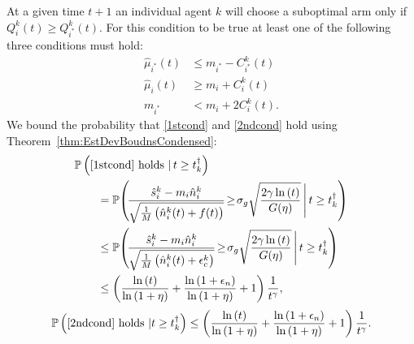 \documentclass[final,5p,times,twocolumn]{elsarticle}
\theoremstyle{definition}
\newcommand{\lnn}[1]{%
	\ln  \left(#1\right)%
}
\begin{document}
At a given time $t+1$ an individual agent $k$ will choose a suboptimal arm only if 
$ Q_i^k(t) \geq Q_{i^*}^k(t)$. 
For this condition to be true at least one of the following three conditions must hold:
\begin{align}
\hat{\mu}_{i^*}(t) &\leq m_{i^*} - C_{i^*}^k(t) \label{1stcond} \\
\hat{\mu}_{i}(t) &\geq m_{i} + C_{i}^k(t) \label{2ndcond} \\
m_{i^*} &< m_{i} + 2 C_{i}^k(t). \label{3rdcond} 
\end{align}
We bound the probability that \eqref{1stcond} and \eqref{2ndcond} hold using Theorem~\ref{thm:EstDevBoudnsCondensed}: 
\begin{align*}
&\mathbb{P}\left( \eqref{1stcond} \textrm{ holds } | \, t \geq  t_k^\dagger \right) \\
& \qquad = \mathbb{P} \!\left(\! \frac{\hat{s}_{i}^k - m_{i} \hat{n}_{i}^k}{\sqrt{ \frac{1}{M} \left( \hat{n}_i^{k}(t) +  f(t)\right) }} \! \geq \! \sigma_g \sqrt{\frac{2 \gamma \lnn{t}}{G(\eta)}} \, \Bigg | \, t \geq t_k^\dagger \right)\\
& \qquad \leq \mathbb{P} \!\left(\! \frac{\hat{s}_{i}^k - m_{i} \hat{n}_{i}^k}{\sqrt{ \frac{1}{M} \left( \hat{n}_i^{k}(t) +  \epsilon_c^k\right) }} \! \geq \! \sigma_g \sqrt{\frac{2 \gamma \lnn{t}}{G(\eta)}} \, \Bigg | \, t \geq t_k^\dagger \right)\\
& \qquad \leq \left( \frac{\lnn{t}}{\lnn{1+\eta}} + \frac{\lnn{1+\epsilon_n}}{\lnn{1+\eta}} + 1\right) \frac{1}{t^\gamma},
\end{align*}
\begin{equation*}
\mathbb{P}\left( \eqref{2ndcond} \textrm{ holds } | t \geq  t_k^\dagger \right) \leq \left( \frac{\lnn{t}}{\lnn{1+\eta}} + \frac{\lnn{1+\epsilon_n}}{\lnn{1+\eta}} + 1\right) \frac{1}{t^\gamma}.
\end{equation*}
\end{document}

